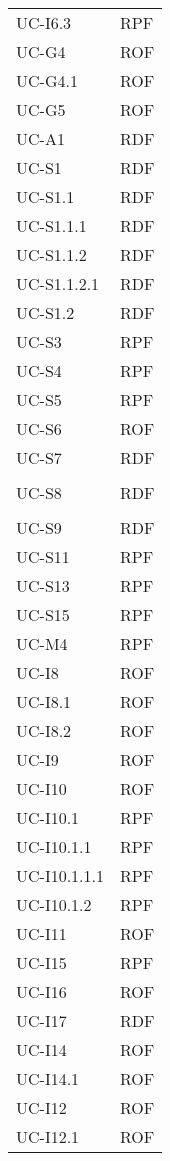 \begin{longtable}{| p{5cm} | p{5cm} |}
		UC-I6.3 & RPF \\
		UC-G4 & ROF \\
		\rowcolor{LightGray}
		UC-G4.1 & ROF \\
		UC-G5 & ROF \\
		\rowcolor{LightGray}
		UC-A1 & RDF\\
		UC-S1 & RDF \\
		\rowcolor{LightGray}
		UC-S1.1 & RDF\\
		UC-S1.1.1 & RDF\\
		\rowcolor{LightGray}
		UC-S1.1.2 & RDF\\
		UC-S1.1.2.1 & RDF\\
		UC-S1.2 & RDF\\
		\rowcolor{LightGray}
		UC-S3 & RPF\\
		UC-S4 & RPF\\
		\rowcolor{LightGray}
		UC-S5 & RPF \\
		UC-S6 & ROF \\
		UC-S7 & RDF \\\\
		UC-S8 & RDF \\\\
		UC-S9 & RDF \\
		\rowcolor{LightGray}
		UC-S11 & RPF \\
		UC-S13 & RPF \\
		\rowcolor{LightGray}
		UC-S15 & RPF \\ 
		UC-M4 & RPF\\
		\rowcolor{LightGray}
		UC-I8 & ROF \\
		UC-I8.1 & ROF \\
		UC-I8.2 & ROF \\
		UC-I9 & ROF \\
		\rowcolor{LightGray}
		UC-I10 & ROF \\
		UC-I10.1 & RPF \\
		\rowcolor{LightGray}
		UC-I10.1.1 & RPF\\
		UC-I10.1.1.1 & RPF \\
		UC-I10.1.2 & RPF \\
		UC-I11 & ROF \\
		\rowcolor{LightGray}
		UC-I15 & RPF \\
		UC-I16 & ROF \\
		UC-I17 & RDF \\
		\rowcolor{LightGray}
		UC-I14 & ROF \\
		UC-I14.1 & ROF \\
		UC-I12 & ROF \\
		UC-I12.1 & ROF \\

\end{longtable}
